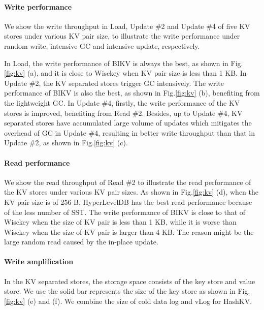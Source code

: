 \documentclass[sigconf]{acmart}
\begin{document}
\paragraph*{Write performance}
We show the write throughput in Load, Update \#2 and Update \#4 of five KV stores under various KV pair size, to illustrate the write performance under random write, intensive GC and intensive update, respectively.

In Load, the write performance of BIKV is always the best, as shown in Fig.\ref{fig:kv} (a), and it is close to Wisckey when KV pair size is less than 1 KB. In Update \#2, the KV separated stores trigger GC intensively. The write performance of BIKV is also the best, as shown in Fig.\ref{fig:kv} (b), benefiting from the lightweight GC. In Update \#4, firstly, the write performance of the KV stores is improved, benefiting from Read \#2. Besides, up to Update \#4, KV separated stores have accumulated large volume of updates which mitigates the overhead of GC in Update \#4, resulting in better write throughput than that in Update \#2, as shown in Fig.\ref{fig:kv} (c).

\paragraph*{Read performance}
We show the read throughput of Read \#2 to illustrate the read performance of the KV stores under various KV pair sizes. As shown in Fig.\ref{fig:kv} (d), when the KV pair size is of 256 B, HyperLevelDB has the best read performance because of the less number of SST. The write performance of BIKV is close to that of Wisckey when the size of KV pair is less than 1 KB, while it is worse than Wisckey when the size of KV pair is larger than 4 KB. The reason might be the large random read caused by the in-place update.

\paragraph*{Write amplification}
In the KV separated stores, the storage space consists of the key store and value store. We use the solid bar represents the size of the key store as shown in Fig.\ref{fig:kv} (e) and (f). We combine the size of cold data log and vLog for HashKV. 
\end{document}
